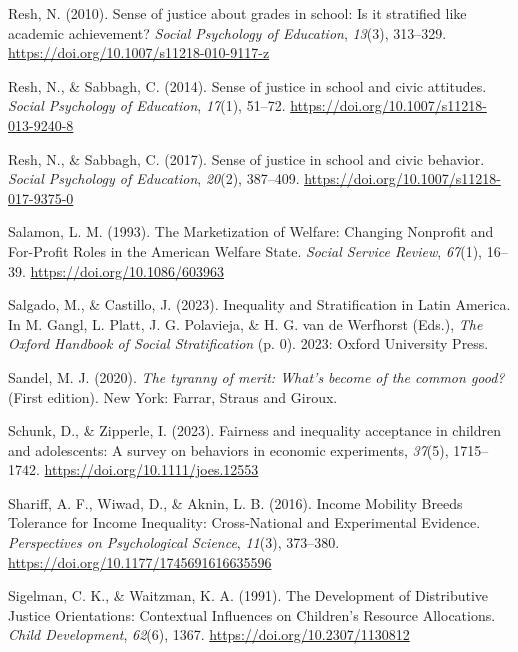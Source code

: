 \documentclass[
  letterpaper,
  DIV=11,
  numbers=noendperiod]{scrartcl}
\newlength{\cslhangindent}
\newlength{\cslentryspacingunit} %
\newenvironment{CSLReferences}[2] %
 {%
  \setlength{\parindent}{0pt}
  \ifodd #1
  \let\oldpar\par
  \def\par{\hangindent=\cslhangindent\oldpar}
  \fi
  \setlength{\parskip}{#2\cslentryspacingunit}
 }%
 {}
\begin{document}
\begin{CSLReferences}{1}{0}
\leavevmode{}%
Resh, N. (2010). Sense of justice about grades in school: Is it
stratified like academic achievement? \emph{Social Psychology of
Education}, \emph{13}(3), 313--329.
\url{https://doi.org/10.1007/s11218-010-9117-z}

\leavevmode{}%
Resh, N., \& Sabbagh, C. (2014). Sense of justice in school and civic
attitudes. \emph{Social Psychology of Education}, \emph{17}(1), 51--72.
\url{https://doi.org/10.1007/s11218-013-9240-8}

\leavevmode{}%
Resh, N., \& Sabbagh, C. (2017). Sense of justice in school and civic
behavior. \emph{Social Psychology of Education}, \emph{20}(2), 387--409.
\url{https://doi.org/10.1007/s11218-017-9375-0}

\leavevmode{}%
Salamon, L. M. (1993). The {Marketization} of {Welfare}: {Changing
Nonprofit} and {For-Profit Roles} in the {American Welfare State}.
\emph{Social Service Review}, \emph{67}(1), 16--39.
\url{https://doi.org/10.1086/603963}

\leavevmode{}%
Salgado, M., \& Castillo, J. (2023). Inequality and {Stratification} in
{Latin America}. In M. Gangl, L. Platt, J. G. Polavieja, \& H. G. van de
Werfhorst (Eds.), \emph{The {Oxford Handbook} of {Social
Stratification}} (p. 0). 2023: Oxford University Press.

\leavevmode{}%
Sandel, M. J. (2020). \emph{The tyranny of merit: {What}'s become of the
common good?} (First edition). New York: {Farrar, Straus and Giroux}.

\leavevmode{}%
Schunk, D., \& Zipperle, I. (2023). Fairness and inequality acceptance
in children and adolescents: {A} survey on behaviors in economic
experiments, \emph{37}(5), 1715--1742.
\url{https://doi.org/10.1111/joes.12553}

\leavevmode{}%
Shariff, A. F., Wiwad, D., \& Aknin, L. B. (2016). Income {Mobility
Breeds Tolerance} for {Income Inequality}: {Cross-National} and
{Experimental Evidence}. \emph{Perspectives on Psychological Science},
\emph{11}(3), 373--380. \url{https://doi.org/10.1177/1745691616635596}

\leavevmode{}%
Sigelman, C. K., \& Waitzman, K. A. (1991). The {Development} of
{Distributive Justice Orientations}: {Contextual Influences} on
{Children}'s {Resource Allocations}. \emph{Child Development},
\emph{62}(6), 1367. \url{https://doi.org/10.2307/1130812}


\end{CSLReferences}
\end{document}
